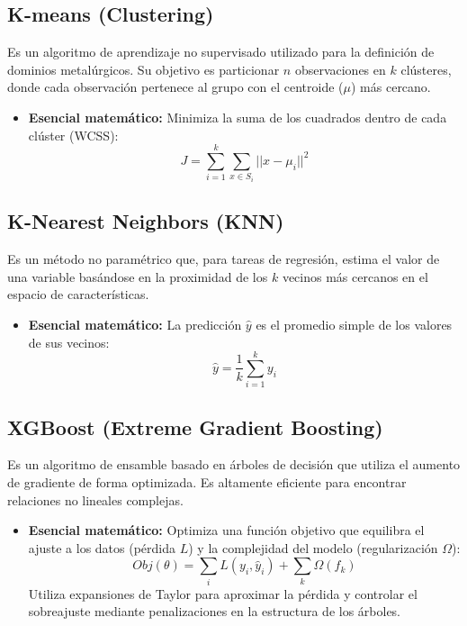 \documentclass[12pt,letterpaper]{article}
\begin{document}
	\subsection{K-means (Clustering)}
	Es un algoritmo de aprendizaje no supervisado utilizado para la definición de dominios metalúrgicos. Su objetivo es particionar $n$ observaciones en $k$ clústeres, donde cada observación pertenece al grupo con el centroide ($\mu$) más cercano.
	\begin{itemize}
		\item \textbf{Esencial matemático:} Minimiza la suma de los cuadrados dentro de cada clúster (WCSS):
		\begin{equation}
			J = \sum_{i=1}^{k} \sum_{x \in S_i} ||x - \mu_i||^2
		\end{equation}
	\end{itemize}
	
	\subsection{K-Nearest Neighbors (KNN)}
	Es un método no paramétrico que, para tareas de regresión, estima el valor de una variable basándose en la proximidad de los $k$ vecinos más cercanos en el espacio de características.
	\begin{itemize}
		\item \textbf{Esencial matemático:} La predicción $\hat{y}$ es el promedio simple de los valores de sus vecinos:
		\begin{equation}
			\hat{y} = \frac{1}{k} \sum_{i=1}^{k} y_i
		\end{equation}
	\end{itemize}
	
	\subsection{XGBoost (Extreme Gradient Boosting)}
	Es un algoritmo de ensamble basado en árboles de decisión que utiliza el aumento de gradiente de forma optimizada. Es altamente eficiente para encontrar relaciones no lineales complejas.
	\begin{itemize}
		\item \textbf{Esencial matemático:} Optimiza una función objetivo que equilibra el ajuste a los datos (pérdida $L$) y la complejidad del modelo (regularización $\Omega$):
		\begin{equation}
			Obj(\theta) = \sum_{i} L(y_i, \hat{y}_i) + \sum_{k} \Omega(f_k)
		\end{equation}
		Utiliza expansiones de Taylor para aproximar la pérdida y controlar el sobreajuste mediante penalizaciones en la estructura de los árboles.
	\end{itemize}
	\fi
	


	
\end{document}
